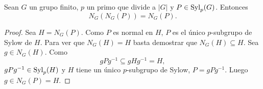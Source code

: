 %
%
%





\begin{lemma}
	\label{lemma:normalizador}
	Sean $G$ un grupo finito, $p$ un primo que divide a $|G|$ y
	$P\in\mathrm{Syl}_p(G)$. Entonces
	\[
	N_G(N_G(P))=N_G(P). 
	\]
\end{lemma}

\begin{proof}
	Sea $H=N_G(P)$. Como $P$ es normal en $H$, $P$ es el único $p$-subgrupo de
	Sylow de $H$. Para ver que $N_G(H)=H$ basta demostrar que $N_G(H)\subseteq
	H$. Sea $g\in N_G(H)$. Como 
	\[
	gPg^{-1}\subseteq gHg^{-1}=H,
	\]
	$gPg^{-1}\in\mathrm{Syl}_p(H)$ y $H$ tiene un único $p$-subgrupo de Sylow, 
	$P=gPg^{-1}$.  Luego $g\in N_G(P)=H$. 
\end{proof}

